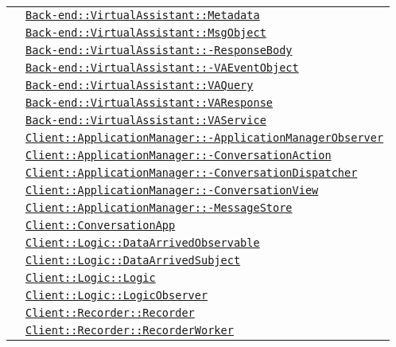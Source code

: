 \begin{longtable}{|>{\centering}m{3cm}|m{10cm}<{\centering}|}
& \hyperref[Back-end::VirtualAssistant::Metadata]{\texttt{Back-end::VirtualAssistant::Metadata}}\\
& \hyperref[Back-end::VirtualAssistant::MsgObject]{\texttt{Back-end::VirtualAssistant::MsgObject}}\\
& \hyperref[Back-end::VirtualAssistant::ResponseBody]{\texttt{Back-end::VirtualAssistant::-\linebreak ResponseBody}}\\
& \hyperref[Back-end::VirtualAssistant::VAEventObject]{\texttt{Back-end::VirtualAssistant::-\linebreak VAEventObject}}\\
& \hyperref[Back-end::VirtualAssistant::VAQuery]{\texttt{Back-end::VirtualAssistant::VAQuery}}\\
& \hyperref[Back-end::VirtualAssistant::VAResponse]{\texttt{Back-end::VirtualAssistant::VAResponse}}\\
& \hyperref[Back-end::VirtualAssistant::VAService]{\texttt{Back-end::VirtualAssistant::VAService}}\\
& \hyperref[Client::ApplicationManager::ApplicationManagerObserver]{\texttt{Client::ApplicationManager::-\linebreak ApplicationManagerObserver}}\\
& \hyperref[Client::ApplicationManager::ConversationAction]{\texttt{Client::ApplicationManager::-\linebreak ConversationAction}}\\
& \hyperref[Client::ApplicationManager::ConversationDispatcher]{\texttt{Client::ApplicationManager::-\linebreak ConversationDispatcher}}\\
& \hyperref[Client::ApplicationManager::ConversationView]{\texttt{Client::ApplicationManager::-\linebreak ConversationView}}\\
& \hyperref[Client::ApplicationManager::MessageStore]{\texttt{Client::ApplicationManager::-\linebreak MessageStore}}\\
& \hyperref[Client::ConversationApp]{\texttt{Client::ConversationApp}}\\
& \hyperref[Client::Logic::DataArrivedObservable]{\texttt{Client::Logic::DataArrivedObservable}}\\
& \hyperref[Client::Logic::DataArrivedSubject]{\texttt{Client::Logic::DataArrivedSubject}}\\
& \hyperref[Client::Logic::Logic]{\texttt{Client::Logic::Logic}}\\
& \hyperref[Client::Logic::LogicObserver]{\texttt{Client::Logic::LogicObserver}}\\
& \hyperref[Client::Recorder::Recorder]{\texttt{Client::Recorder::Recorder}}\\
& \hyperref[Client::Recorder::RecorderWorker]{\texttt{Client::Recorder::RecorderWorker}}\\ \hline


\end{longtable}
